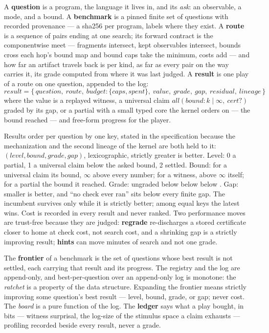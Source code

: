 A \textbf{question} is a program, the language it lives in, and its
\emph{ask}: an observable, a mode, and a bound. A \textbf{benchmark}
is a pinned finite set of questions with recorded provenance --- a
sha256 per program, labels where they exist. A \textbf{route} is a
sequence of pairs ending at one search; its forward contract is the
componentwise meet --- fragments intersect, kept observables
intersect, bounds cross each hop's bound map and bound caps take the
minimum, costs add --- and how far an artifact travels back is per
kind, as far as every pair on the way carries it, its grade computed
from where it was last judged. A \textbf{result} is one play of a
route on one question, appended to the log:
\[
\textit{result} = \{\, \textit{question},\ \textit{route},\
\textit{budget}: \{\textit{caps}, \textit{spent}\},\ \textit{value},\
\textit{grade},\ \textit{gap},\ \textit{residual},\ \textit{lineage} \,\}
\]
where the value is a replayed witness, a universal claim
$\textit{all}(\textit{bound}: k \mid \infty,\ \textit{cert}?)$ graded
by its gap, or a partial with a small typed core the kernel orders on
--- the bound reached --- and free-form progress for the player.

Results order per question by one key, stated in the specification
because the mechanization and the second lineage of the kernel are
both held to it: $(\textit{level}, \textit{bound}, \textit{grade},
\textit{gap})$, lexicographic, strictly greater is better. Level: 0 a
partial, 1 a universal claim below the asked bound, 2 settled. Bound:
for a universal claim its bound, $\infty$ above every number; for a
witness, above $\infty$ itself; for a partial the bound it reached.
Grade: ungraded below \grade{claimed} below \grade{checked} below
\grade{certified}. Gap: smaller is better, and ``no check ever ran''
sits below every finite gap. The incumbent survives only while it is
strictly better; among equal keys the latest wins. Cost is recorded
in every result and never ranked. Two performance moves are
trust-free because they are judged: \textbf{regrade} re-discharges a
stored certificate closer to home at check cost, not search cost,
and a shrinking gap is a strictly improving result; \textbf{hints}
can move minutes of search and not one grade.

The \textbf{frontier} of a benchmark is the set of questions whose
best result is not settled, each carrying that result and its
progress. The registry and the log are append-only, and
best-per-question over an append-only log is monotone: the
\emph{ratchet} is a property of the data structure. Expanding the
frontier means strictly improving some question's best result ---
level, bound, grade, or gap; never cost. The \emph{board} is a pure
function of the log. The \textbf{ledger} says what a play bought, in
bits --- witness surprisal, the log-size of the stimulus space a
claim exhausts --- profiling recorded beside every result, never a
grade.

